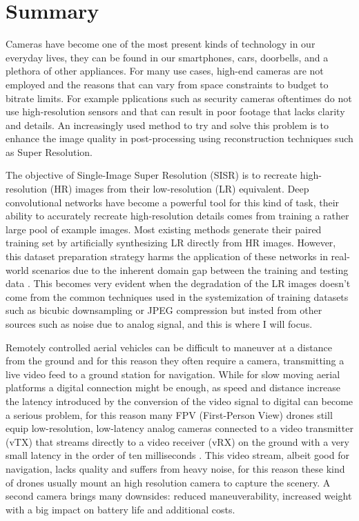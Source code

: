 \chapter*{Summary}
\label{summary}


Cameras have become one of the most present kinds of technology in our everyday lives, they can be found in our smartphones, cars, doorbells, and a plethora of other appliances. For many use cases, high-end cameras are not employed and the reasons that can vary from space constraints to budget to bitrate limits. For example pplications such as security cameras oftentimes do not use high-resolution sensors and that can result in poor footage that lacks clarity and details. An increasingly used method to try and solve this problem is to enhance the image quality in post-processing using reconstruction techniques such as Super Resolution.

The objective of Single-Image Super Resolution (SISR) is to recreate high-resolution (HR) images from their low-resolution (LR) equivalent.
Deep convolutional networks have become a powerful tool for this kind of task, their ability to accurately recreate high-resolution details comes from training a rather large pool of example images.
Most existing methods generate their paired training set by artificially synthesizing LR directly from HR images. However, this dataset preparation strategy harms the application of these networks in real-world scenarios due to the inherent domain gap between the training and testing data \cite{9711325}.
This becomes very evident when the degradation of the LR images doesn't come from the common techniques used in the systemization of training datasets such as bicubic downsampling or JPEG compression but insted from other sources such as noise due to analog signal, and this is where I will focus.

Remotely controlled aerial vehicles can be difficult to maneuver at a distance from the ground and for this reason they often require a camera, transmitting a live video feed to a ground station for navigation. While for slow moving aerial platforms a digital connection might be enough, as speed and distance increase the latency introduced by the conversion of the video signal to digital can become a serious problem, for this reason many FPV (First-Person View) drones still equip low-resolution, low-latency analog cameras connected to a video transmitter (vTX) that streams directly to a video receiver (vRX) on the ground with a very small latency in the order of ten milliseconds \cite{oscar}. This video stream, albeit good for navigation, lacks quality and suffers from heavy noise, for this reason these kind of drones usually mount an high resolution camera to capture the scenery. A second camera brings many downsides: reduced maneuverability, increased weight with a big impact on battery life and additional costs.

